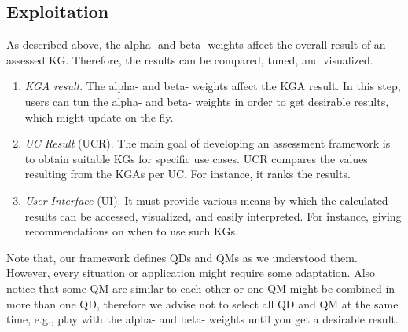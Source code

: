 \documentclass[runningheads]{llncs}
\begin{document}
\subsection{Exploitation}
As described above, the alpha- and beta- weights affect the overall result of an assessed KG. Therefore, the results can be compared, tuned, and visualized.
\begin{enumerate}
    \item[i.] \textit{KGA result}. The alpha- and beta- weights affect the KGA result. In this step, users can tun the alpha- and beta- weights in order to get desirable results, which might update on the fly.
    \item[ii.] \textit{UC Result} (UCR). The main goal of developing an assessment framework is to obtain suitable KGs for specific use cases. UCR compares the values resulting from the KGAs per UC. For instance, it ranks the results.
    \item[iii.] \textit{User Interface} (UI). It must provide various means by which the calculated results can be accessed, visualized, and easily interpreted. For instance, giving recommendations on when to use such KGs. 
\end{enumerate}
Note that, our framework defines QDs and QMs as we understood them. However, every situation or application might require some adaptation. Also notice that some QM are similar to each other or one QM might be combined in more than one QD, therefore we advise not to select all QD and QM at the same time, e.g., play with the alpha- and beta- weights until you get a desirable result.

%
%
\end{document}
